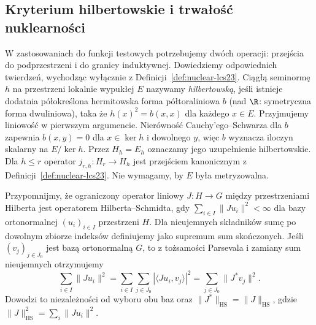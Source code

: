 \subsection{Kryterium hilbertowskie i trwałość nuklearności}
\label{subsec:nuclear-permanence23}

W zastosowaniach do funkcji testowych potrzebujemy dwóch operacji:
przejścia do podprzestrzeni i do granicy induktywnej. Dowiedziemy
odpowiednich twierdzeń, wychodząc wyłącznie z
Definicji~\ref{def:nuclear-lcs23}. Ciągłą seminormę $h$ na przestrzeni lokalnie wypukłej $E$
nazywamy \emph{hilbertowską}, jeśli istnieje dodatnia
półokreślona hermitowska forma półtoraliniowa $b$ (nad $\R$:
symetryczna forma dwuliniowa), taka że $h(x)^2=b(x,x)$
dla każdego $x\in E$. Przyjmujemy liniowość w pierwszym
argumencie. Nierówność Cauchy'ego--Schwarza dla $b$
zapewnia $b(x,y)=0$ dla $x\in\ker h$ i dowolnego $y$,
więc $b$ wyznacza iloczyn skalarny na $E/\ker h$.
Przez $H_h=E_h$ oznaczamy jego uzupełnienie hilbertowskie.
Dla $h\le r$ operator $j_{r,h}:H_r\to H_h$ jest
przejściem kanonicznym z Definicji~\ref{def:nuclear-lcs23}.
Nie wymagamy, by $E$ była metryzowalna.

Przypomnijmy, że ograniczony operator liniowy $J:H\to G$
między przestrzeniami Hilberta jest operatorem
Hilberta--Schmidta, gdy $\sum_{i\in I}\|Ju_i\|^2<\infty$
dla bazy ortonormalnej $(u_i)_{i\in I}$ przestrzeni $H$.
Dla nieujemnych składników sumę po dowolnym zbiorze
indeksów definiujemy jako supremum sum skończonych.
Jeśli $(v_j)_{j\in J_0}$ jest bazą ortonormalną $G$,
to z tożsamości Parsevala i zamiany sum nieujemnych
otrzymujemy
\[
 \sum_{i\in I}\|Ju_i\|^2
 =\sum_{i\in I}\sum_{j\in J_0}|\langle Ju_i,v_j\rangle|^2
 =\sum_{j\in J_0}\|J^*v_j\|^2.
\]
Dowodzi to niezależności od wyboru obu baz oraz
$\|J^*\|_{\mathrm{HS}}=\|J\|_{\mathrm{HS}}$, gdzie
$\|J\|_{\mathrm{HS}}^2=\sum_i\|Ju_i\|^2$.

